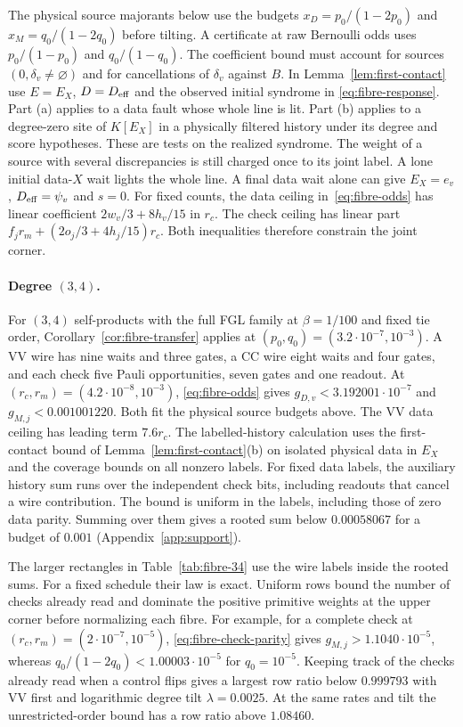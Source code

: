 \documentclass[10pt,twocolumn]{article}
\theoremstyle{definition}
\begin{document}
The physical source majorants below use the budgets
$x_D=p_0/(1-2p_0)$ and $x_M=q_0/(1-2q_0)$ before tilting. A
certificate at raw Bernoulli odds uses $p_0/(1-p_0)$ and $q_0/(1-q_0)$.
The coefficient bound must account
for sources $(0,\delta_v\ne\varnothing)$ and for cancellations of
$\delta_v$ against $B$. In Lemma~\ref{lem:first-contact} use
$E=E_X$, $D=D_{\rm eff}$ and the observed initial syndrome in
\eqref{eq:fibre-response}. Part (a) applies to a data fault whose
whole line is lit. Part (b) applies to a degree-zero site of $K[E_X]$
in a physically filtered history under its degree and score hypotheses.
These are tests on the realized syndrome. The weight of a source with
several discrepancies is still charged once to its joint label.
A lone initial data-$X$ wait lights the whole line. A final data
wait alone can give $E_X=e_v$, $D_{\rm eff}=\psi_v$ and $s=0$.
For fixed counts, the data ceiling in~\eqref{eq:fibre-odds} has linear
coefficient $2w_v/3+8h_v/15$ in $r_c$. The check ceiling has linear part
$f_jr_m+(2o_j/3+4h_j/15)r_c$. Both inequalities therefore constrain
the joint corner.

\paragraph{Degree $(3,4)$.}
For $(3,4)$ self-products with the full FGL family at $\beta=1/100$
and fixed tie order, Corollary~\ref{cor:fibre-transfer} applies at
$(p_0,q_0)=(3.2\cdot10^{-7},10^{-3})$. A VV wire has nine waits
and three gates, a CC wire eight waits and four gates, and each
check five Pauli opportunities, seven gates and one readout. At
$(r_c,r_m)=(4.2\cdot10^{-8},10^{-3})$, \eqref{eq:fibre-odds} gives
$g_{D,v}<3.192001\cdot10^{-7}$ and $g_{M,j}<0.001001220$.
Both fit the physical source budgets above. The VV data ceiling has
leading term $7.6r_c$. The labelled-history calculation uses the
first-contact bound of Lemma~\ref{lem:first-contact}(b) on isolated
physical data in $E_X$ and the coverage bounds on all nonzero labels.
For fixed data labels, the auxiliary history sum runs over the
independent check bits, including readouts that cancel a wire
contribution. The bound is uniform in the labels, including those of
zero data parity. Summing over them gives a rooted sum below
$0.00058067$ for a budget of $0.001$ (Appendix~\ref{app:support}).

The larger rectangles in Table~\ref{tab:fibre-34} use the wire labels
inside the rooted sums. For a fixed schedule their law is exact.
Uniform rows bound the number of checks already read and dominate
the positive primitive weights at the upper corner before normalizing
each fibre. For example, for a complete
check at $(r_c,r_m)=(2\cdot10^{-7},10^{-5})$,
\eqref{eq:fibre-check-parity} gives $g_{M,j}>1.1040\cdot10^{-5}$,
whereas $q_0/(1-2q_0)<1.00003\cdot10^{-5}$ for $q_0=10^{-5}$.
Keeping track of the checks already read when a control flips gives
a largest row ratio below $0.999793$ with VV first and logarithmic
degree tilt $\lambda=0.0025$. At the same rates and tilt the
unrestricted-order bound has a row ratio above $1.08460$.
\end{document}

